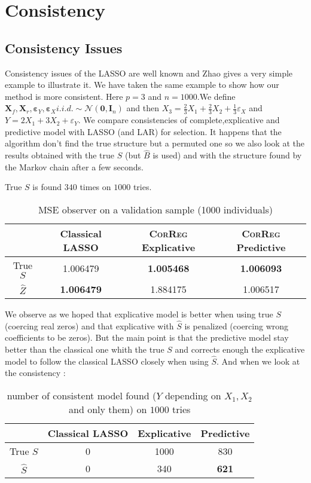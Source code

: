 \documentclass[11pt,a4paper]{report}
\begin{document}
	\section{Consistency}
		\subsection{Consistency Issues}\label{consistency}
		Consistency issues of the LASSO are well known and Zhao \cite{Zhao2006MSC} gives a very simple example to illustrate it.
		We have taken the same example to show how our method is more consistent.
		Here $p=3$ and $n=1000$.We define $\boldsymbol{X}_f,\boldsymbol{X}_r,\boldsymbol{\varepsilon}_Y,\boldsymbol{\varepsilon}_{X} i.i.d. \sim \mathcal{N}(\boldsymbol{0},\boldsymbol{I}_n)$ and then $X_3=\frac{2}{3}X_1+\frac{2}{3}X_2+\frac{1}{3}\varepsilon_X$ and $Y=2X_1+3X_2+\varepsilon_Y$.
		We compare consistencies of complete,explicative and predictive model with LASSO (and LAR) for selection.
		It happens that the algorithm don't find the true structure but a permuted one so we also look at the results obtained with the true $S$ (but $\hat{B}$ is used) and with the structure found by the Markov chain after a few seconds.
		
		True $S$ is found $340$ times on $1000$ tries.
		
		\begin{table}[h!]
		\centering
		\begin{tabular}{|c|c|c|c|}
		\hline 
		 & Classical LASSO & \textsc{CorReg} Explicative & \textsc{CorReg} Predictive \\ 
		\hline 
		True $S$ &  1.006479 & \textbf{1.005468} & \textbf{1.006093} \\ 
		\hline 
		$\hat{Z}$ & \textbf{1.006479} & 1.884175 & 1.006517 \\ 
		\hline 
		\end{tabular} 
		\caption{MSE observer on a validation sample (1000 individuals)}
		\end{table}

		We observe as we hoped that explicative model is better when using true $S$ (coercing real zeros) and that explicative with $\hat{S}$ is penalized (coercing wrong coefficients to be zeros).
		But the main point is that the predictive model stay better than the classical one whith the true $S$ and corrects enough the explicative model to follow the classical LASSO closely when using $\hat{S}$. 
		And when we look at the consistency :
		\begin{table}[h!]	
		\centering
		\begin{tabular}{|c|c|c|c|}
		\hline 
		 & Classical LASSO & Explicative & Predictive \\ 
		\hline 
		True $S$ &  0 & 1000 & 830 \\ 
		\hline 
		$\hat{S}$ & 0 & 340 & \textbf{621} \\ 
		\hline 
		\end{tabular} 
		\caption{number of consistent model found ($Y$ depending on $X_1,X_2$ and only them) on $1000$ tries}
		\end{table}				
		
\end{document}
